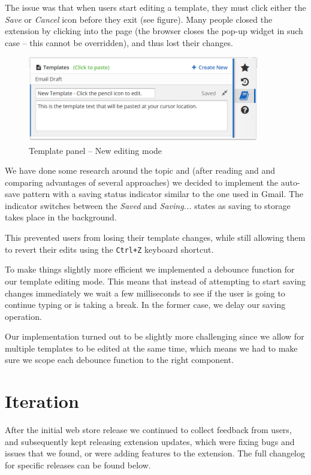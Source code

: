 \documentclass[bsc,frontabs,twoside,singlespacing,parskip,deptreport]{infthesis}
\begin{document}
The issue was that when users start editing a template, they must click either the \textit{Save} or \textit{Cancel} icon before they exit (see figure). Many people closed the extension by clicking into the page (the browser closes the pop-up widget in such case -- this cannot be overridden), and thus lost their changes.

\begin{figure}[h]
\centering
\includegraphics[width=0.9\textwidth]{../docs/template-edit-mode.png}
\caption{Template panel -- New editing mode}
\end{figure}

We have done some research around the topic and (after reading \cite{A26} and \cite{A27} and comparing advantages of several approaches) we decided to implement the auto-save pattern with a saving status indicator similar to the one used in Gmail. The indicator switches between the \textit{Saved} and \textit{Saving...} states as saving to storage takes place in the background. 

This prevented users from losing their template changes, while still allowing them to revert their edits using the \texttt{Ctrl+Z} keyboard shortcut.

To make things slightly more efficient we implemented a debounce function \cite{A28} for our template editing mode. This means that instead of attempting to start saving changes immediately we wait a few milliseconds to see if the user is going to continue typing or is taking a break. In the former case, we delay our saving operation.

Our implementation turned out to be slightly more challenging since we allow for multiple templates to be edited at the same time, which means we had to make sure we scope each debounce function to the right component.

\section{Iteration}
After the initial web store release we continued to collect feedback from users, and subsequently kept releasing extension updates, which were fixing bugs and issues that we found, or were adding features to the extension. The full changelog for specific releases can be found below.
\end{document}
